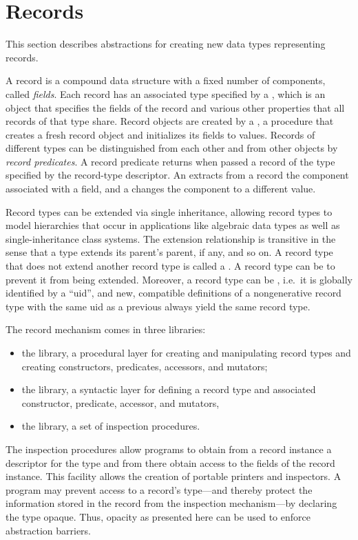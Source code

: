 \chapter{Records}
\label{recordschapter}
This section describes abstractions for creating new data types
representing records.

A record is a compound data structure with a fixed number of
components, called \textit{fields}.  Each record has
an associated type specified by a ,
which is an object that specifies the fields of the record and various
other properties that all records of that type share.  Record objects
are created by a , a procedure that
creates a fresh record object and initializes its fields to values.
Records of different types can be distinguished from each other and
from other objects by \textit{record predicates}. A record predicate
returns \schtrue{} when passed a record of the type specified by the
record-type descriptor.  An  extracts from a record
the component associated with a field, and a 
changes the component to a different value.

Record types can be extended via single inheritance, allowing record
types to model hierarchies that occur in applications like algebraic
data types as well as single-inheritance class systems.  The extension
relationship is transitive in the sense that a type extends its
parent's parent, if any, and so on.  A record type that does not
extend another record type is called a .  A
record type can be  to prevent it from being
extended.  Moreover, a record type can be ,
i.e.\ it is globally identified by a ``uid'', and new, compatible
definitions of a nongenerative record type with the same uid as a
previous always yield the same record type.

The record mechanism comes in three libraries:

\begin{itemize}
\item the  library,
  a procedural layer for creating and manipulating record types and creating
  constructors, predicates, accessors, and mutators;
\item the  library,
  a syntactic layer for defining a record type and
  associated constructor, predicate, accessor, and mutators,
\item the  library,
  a set of inspection procedures.
\end{itemize}
% 
The inspection procedures allow programs to obtain from a record
instance a descriptor for the type and from there obtain access to the
fields of the record instance. This facility allows the creation of
portable printers and inspectors.  A program may prevent access to a
record's type---and thereby protect the information stored in the
record from the inspection mechanism---by declaring the type opaque.
Thus, opacity as presented here can be used to enforce abstraction
barriers.

